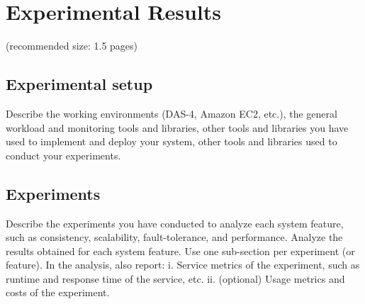 \section{Experimental Results}
(recommended size: 1.5 pages)

\subsection{Experimental setup}
Describe the working environments (DAS-4, Amazon EC2,
etc.), the general workload and monitoring tools and libraries, other tools and
libraries you have used to implement and deploy your system, other tools and
libraries used to conduct your experiments.

\subsection{Experiments}
Describe the experiments you have conducted to analyze each
system feature, such as consistency, scalability, fault-tolerance, and
performance. Analyze the results obtained for each system feature. Use one
sub-section per experiment (or feature). In the analysis, also report:
i. Service metrics of the experiment, such as runtime and response time of
the service, etc.
ii. (optional) Usage metrics and costs of the experiment.
